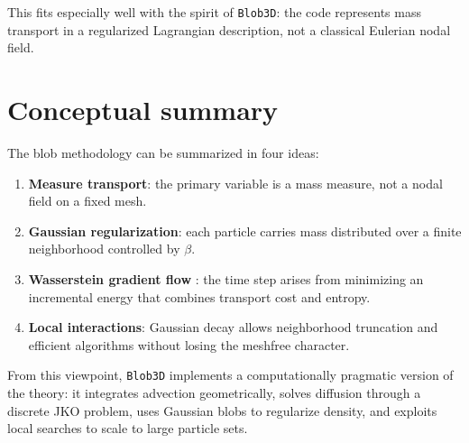 \documentclass[11pt,a4paper]{article}
\begin{document}
This fits especially well with the spirit of \texttt{Blob3D}: the code represents mass transport in a regularized Lagrangian description, not a classical Eulerian nodal field.

\section{Conceptual summary}
The blob methodology can be summarized in four ideas:
\begin{enumerate}[label=\arabic*.]
  \item \textbf{Measure transport}: the primary variable is a mass measure, not a nodal field on a fixed mesh.
  \item \textbf{Gaussian regularization}: each particle carries mass distributed over a finite neighborhood controlled by $\beta$.
  \item \textbf{Wasserstein gradient flow} \citep{jordan1998}: the time step arises from minimizing an incremental energy that combines transport cost and entropy.
  \item \textbf{Local interactions}: Gaussian decay allows neighborhood truncation and efficient algorithms without losing the meshfree character.
\end{enumerate}

From this viewpoint, \texttt{Blob3D} implements a computationally pragmatic version of the theory: it integrates advection geometrically, solves diffusion through a discrete JKO problem, uses Gaussian blobs to regularize density, and exploits local searches to scale to large particle sets.



\end{document}
